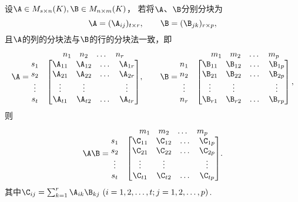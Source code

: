 \begin{enumerate}
	设\(\A\in M_{s \times n}(K),
	\B\in M_{n \times m}(K)\)，
	若将\(\A\)、\(\B\)分别分块为\[
		\A=(\A_{ij})_{t \times r}, \qquad
		\B=(\B_{jk})_{r \times p},
	\]
	且\(\A\)的列的分块法与\(\B\)的行的分块法一致，即\[
		\A = \begin{matrix}
			& \begin{matrix} n_1 & n_2 & \dots & n_r \end{matrix} \\
			\begin{matrix} s_1 \\ s_2 \\ \vdots \\ s_t \end{matrix} & \begin{bmatrix}
			\A_{11} & \A_{12} & \dots & \A_{1r} \\
			\A_{21} & \A_{22} & \dots & \A_{2r} \\
			\vdots & \vdots & & \vdots \\
			\A_{t1} & \A_{t2} & \dots & \A_{tr}
			\end{bmatrix}
		\end{matrix},
		\qquad
		\B = \begin{matrix}
			& \begin{matrix} m_1 & m_2 & \dots & m_p \end{matrix} \\
			\begin{matrix} n_1 \\ n_2 \\ \vdots \\ n_r \end{matrix} & \begin{bmatrix}
			\B_{11} & \B_{12} & \dots & \B_{1p} \\
			\B_{21} & \B_{22} & \dots & \B_{2p} \\
			\vdots & \vdots & & \vdots \\
			\B_{r1} & \B_{r2} & \dots & \B_{rp}
			\end{bmatrix},
		\end{matrix}
	\]
	则\[
		\A\B = \begin{matrix}
			& \begin{matrix} m_1 & m_2 & \dots & m_p \end{matrix} \\
			\begin{matrix} s_1 \\ s_2 \\ \vdots \\ s_t \end{matrix} & \begin{bmatrix}
			\C_{11} & \C_{12} & \dots & \C_{1p} \\
			\C_{21} & \C_{22} & \dots & \C_{2p} \\
			\vdots & \vdots & & \vdots \\
			\C_{t1} & \C_{t2} & \dots & \C_{tp}
			\end{bmatrix}
		\end{matrix}.
	\]
	其中\(\C_{ij}=\sum_{k=1}^r \A_{ik} \B_{kj}\ (i=1,2,\dotsc,t;j=1,2,\dotsc,p)\).
\end{enumerate}
